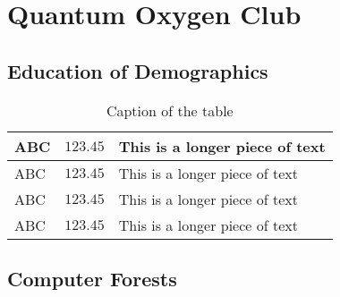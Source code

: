 \chapter{Quantum Oxygen Club}
\section{Education of Demographics}
\lipsum[1-3]

\begin{table}
\caption{Caption of the table}
\begin{tabularx}{\linewidth}{LCp{75mm}}
\toprule
ABC & $123.45$ & This is a longer piece of text\\
\midrule
ABC & $123.45$ & This is a longer piece of text\\
ABC & $123.45$ & This is a longer piece of text\\
ABC & $123.45$ & This is a longer piece of text\\
\bottomrule
\end{tabularx}
\end{table}

\lipsum[4-6]
\section{Computer Forests}
\lipsum[1-7]